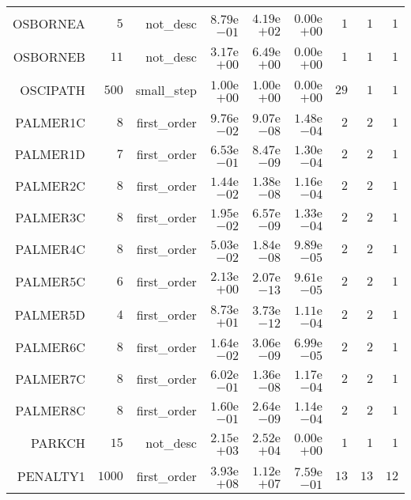 \begin{longtable}{rrrrrrrrr}
OSBORNEA & \(     5\) & not\_desc & \( 8.79\)e\(-01\) & \( 4.19\)e\(+02\) & \( 0.00\)e\(+00\) & \(     1\) & \(     1\) & \(     1\) \\
OSBORNEB & \(    11\) & not\_desc & \( 3.17\)e\(+00\) & \( 6.49\)e\(+00\) & \( 0.00\)e\(+00\) & \(     1\) & \(     1\) & \(     1\) \\
OSCIPATH & \(   500\) & small\_step & \( 1.00\)e\(+00\) & \( 1.00\)e\(+00\) & \( 0.00\)e\(+00\) & \(    29\) & \(     1\) & \(     1\) \\
PALMER1C & \(     8\) & first\_order & \( 9.76\)e\(-02\) & \( 9.07\)e\(-08\) & \( 1.48\)e\(-04\) & \(     2\) & \(     2\) & \(     1\) \\
PALMER1D & \(     7\) & first\_order & \( 6.53\)e\(-01\) & \( 8.47\)e\(-09\) & \( 1.30\)e\(-04\) & \(     2\) & \(     2\) & \(     1\) \\
PALMER2C & \(     8\) & first\_order & \( 1.44\)e\(-02\) & \( 1.38\)e\(-08\) & \( 1.16\)e\(-04\) & \(     2\) & \(     2\) & \(     1\) \\
PALMER3C & \(     8\) & first\_order & \( 1.95\)e\(-02\) & \( 6.57\)e\(-09\) & \( 1.33\)e\(-04\) & \(     2\) & \(     2\) & \(     1\) \\
PALMER4C & \(     8\) & first\_order & \( 5.03\)e\(-02\) & \( 1.84\)e\(-08\) & \( 9.89\)e\(-05\) & \(     2\) & \(     2\) & \(     1\) \\
PALMER5C & \(     6\) & first\_order & \( 2.13\)e\(+00\) & \( 2.07\)e\(-13\) & \( 9.61\)e\(-05\) & \(     2\) & \(     2\) & \(     1\) \\
PALMER5D & \(     4\) & first\_order & \( 8.73\)e\(+01\) & \( 3.73\)e\(-12\) & \( 1.11\)e\(-04\) & \(     2\) & \(     2\) & \(     1\) \\
PALMER6C & \(     8\) & first\_order & \( 1.64\)e\(-02\) & \( 3.06\)e\(-09\) & \( 6.99\)e\(-05\) & \(     2\) & \(     2\) & \(     1\) \\
PALMER7C & \(     8\) & first\_order & \( 6.02\)e\(-01\) & \( 1.36\)e\(-08\) & \( 1.17\)e\(-04\) & \(     2\) & \(     2\) & \(     1\) \\
PALMER8C & \(     8\) & first\_order & \( 1.60\)e\(-01\) & \( 2.64\)e\(-09\) & \( 1.14\)e\(-04\) & \(     2\) & \(     2\) & \(     1\) \\
PARKCH & \(    15\) & not\_desc & \( 2.15\)e\(+03\) & \( 2.52\)e\(+04\) & \( 0.00\)e\(+00\) & \(     1\) & \(     1\) & \(     1\) \\
PENALTY1 & \(  1000\) & first\_order & \( 3.93\)e\(+08\) & \( 1.12\)e\(+07\) & \( 7.59\)e\(-01\) & \(    13\) & \(    13\) & \(    12\) \\

\end{longtable}
